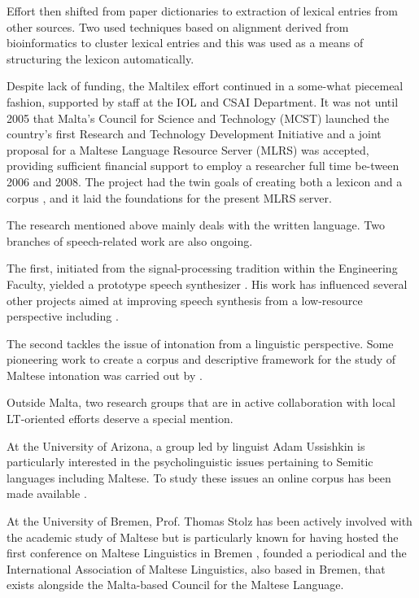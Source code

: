 \documentclass[]{../../metanetpaper}
\begin{document}
\begin{multicols}{2}
Effort then shifted from paper dictionaries to extraction of lexical entries from other sources. Two \cite{Dalli:2001, Attard:2006} used techniques based on alignment derived from bioinformatics to cluster lexical entries and this was used as a means of structuring the lexicon automatically. 

Despite lack of funding, the Maltilex effort continued in a some-what piecemeal fashion, supported by staff at the IOL and CSAI Department. It was not until 2005 that Malta's Council for Science and Technology (MCST) launched the country's first Research and Technology Development Initiative and a joint proposal for a Maltese Language Resource Server (MLRS) was accepted, providing sufficient financial support to employ a researcher full time be-tween 2006 and 2008. The project had the twin goals of creating both a lexicon and a corpus \cite{Rosner:2008}, and it laid the foundations for the present MLRS server.

The research mentioned above mainly deals with the written language. Two branches of speech-related work are also ongoing. 

The first, initiated from the signal-processing tradition within the Engineering Faculty, yielded a prototype speech synthesizer \cite{Micallef:1997}. His work has influenced several other projects aimed at improving speech synthesis from a low-resource perspective including \cite{Calleja:2002, Farrugia:2005, Camilleri:2010 , Borg-et-al:2011}.

The second tackles the issue of intonation \cite{Vella:2007} from a linguistic perspective. Some pioneering work to create a corpus and descriptive framework for the study of Maltese intonation was carried out by \cite{Vella-Farrugia:2006}. 

Outside Malta, two research groups that are in active collaboration with local LT-oriented efforts deserve a special mention.

At the University of Arizona, a group led by linguist Adam Ussishkin is particularly interested in the psycholinguistic issues pertaining to Semitic languages including Maltese. To study these issues an online corpus has been made available \cite{Ussishkin-et-al:2009}. 

At the University of Bremen, Prof. Thomas Stolz has been actively involved with the academic study of Maltese but is particularly known for having hosted the first conference on Maltese Linguistics in Bremen \cite{Comrie-et-al:2009}, founded a periodical\cite{GHILM2} and the International Association of Maltese Linguistics, also based in Bremen, that exists alongside the Malta-based Council for the Maltese Language.


\end{multicols}
\end{document}
